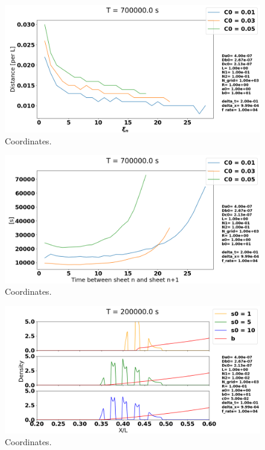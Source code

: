 \documentclass[1p]{elsarticle}        	%
\begin{document}
\begin{figure}
	\centering
	\includegraphics[width=\linewidth]{../figures/deltaC0_x.png}
	\caption{Coordinates.}
	\label{fig:coords}
\end{figure}

\begin{figure}
	\centering
	\includegraphics[width=\linewidth]{../figures/deltaC0_t.png}
	\caption{Coordinates.}
	\label{fig:coords}
\end{figure}

\begin{figure}
	\centering
	\includegraphics[width=\linewidth]{../figures/s0_1-10.png}
	\caption{Coordinates.}
	\label{fig:coords}
\end{figure}
\end{document}
